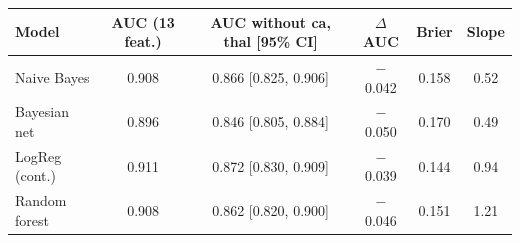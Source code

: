 \begin{tabular}{lccccc}
\toprule
Model & AUC (13 feat.) & AUC without ca, thal [95\% CI] & $\Delta$AUC & Brier & Slope \\
\midrule
Naive Bayes & 0.908 & 0.866 [0.825, 0.906] & $-$0.042 & 0.158 & 0.52 \\
Bayesian net & 0.896 & 0.846 [0.805, 0.884] & $-$0.050 & 0.170 & 0.49 \\
LogReg (cont.) & 0.911 & 0.872 [0.830, 0.909] & $-$0.039 & 0.144 & 0.94 \\
Random forest & 0.908 & 0.862 [0.820, 0.900] & $-$0.046 & 0.151 & 1.21 \\
\bottomrule
\end{tabular}
